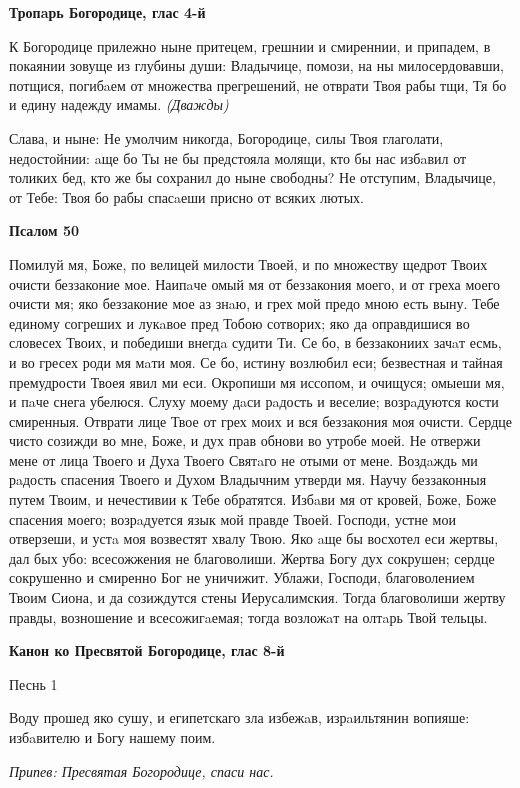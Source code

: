\medskip
\bfseries Тропaрь Богородице, глас 4-й\normalfont{}


 К Богородице прилежно ныне притецем, грешнии и смиреннии, и припадем, в покаянии зовуще из глубины души: Владычице, помози, на ны милосердовавши, потщися, погибaем от множества прегрешений, не отврати Твоя рабы тщи, Тя бо и едину надежду имамы. \itshape (Дважды)\normalfont{}


 Слава, и ныне: Не умолчим никогда, Богородице, силы Твоя глаголати, недостойнии: aще бо Ты не бы предстояла молящи, кто бы нас избaвил от толиких бед, кто же бы сохранил до ныне свободны? Не отступим, Владычице, от Тебе: Твоя бо рабы спасaеши присно от всяких лютых.


\medskip
\bfseries Псалом 50\normalfont{}


Помилуй мя, Боже, по велицей милости Твоей, и по множеству щедрот Твоих очисти беззаконие мое. Наипaче омый мя от беззакония моего, и от греха моего очисти мя; яко беззаконие мое аз знaю, и грех мой предо мною есть выну. Тебе единому согреших и лукaвое пред Тобою сотворих; яко да оправдишися во словесех Твоих, и победиши внегдa судити Ти. Се бо, в беззакониих зачaт есмь, и во гресех роди мя мaти моя. Се бо, истину возлюбил еси; безвестная и тайная премудрости Твоея явил ми еси. Окропиши мя иссопом, и очищуся; омыеши мя, и пaче снега убелюся. Слуху моему дaси рaдость и веселие; возрaдуются кости смиренныя. Отврати лице Твое от грех моих и вся беззакония моя очисти. Сердце чисто созижди во мне, Боже, и дух прав обнови во утробе моей. Не отвержи мене от лица Твоего и Духа Твоего Святaго не отыми от мене. Воздaждь ми рaдость спасения Твоего и Духом Владычним утверди мя. Научу беззаконныя путем Твоим, и нечестивии к Тебе обратятся. Избaви мя от кровей, Боже, Боже спасения моего; возрaдуется язык мой правде Твоей. Господи, устне мои отверзеши, и устa моя возвестят хвалу Твою. Яко aще бы восхотел еси жертвы, дал бых убо: всесожжения не благоволиши. Жертва Богу дух сокрушен; сердце сокрушенно и смиренно Бог не уничижит. Ублажи, Господи, благоволением Твоим Сиона, и да созиждутся стены Иерусалимския. Тогда благоволиши жертву правды, возношение и всесожигaемая; тогда возложaт на олтaрь Твой тельцы.


\medskip
\bfseries Канон ко Пресвятой Богородице, глас 8-й
\normalfont{}

\medskip
Песнь 1


Воду прошед яко сушу, и египетскаго зла избежaв, изрaильтянин вопияше: избaвителю и Богу нашему поим.


\itshape Припев:\normalfont{} Пресвятая Богородице, спаси нас.


